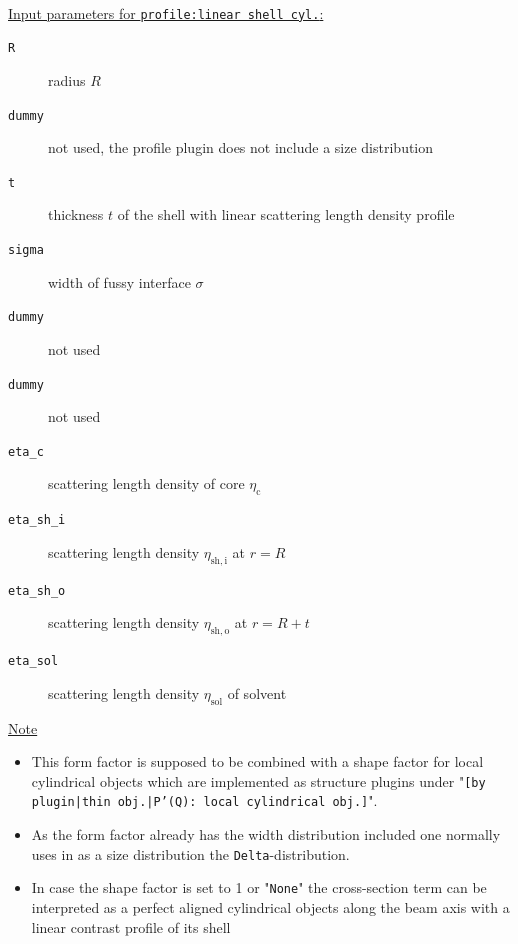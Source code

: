 \hspace{1pt}\\
\uline{Input parameters for \texttt{profile:linear shell cyl.}:}
\begin{description}
    \item[\texttt{R}] radius $R$
    \item[\texttt{dummy}] not used, the profile plugin does not include a size distribution
    \item[\texttt{t}] thickness $t$ of the shell with linear scattering length density profile
    \item[\texttt{sigma}] width of fussy interface $\sigma$
    \item[\texttt{dummy}] not used
    \item[\texttt{dummy}] not used
    \item[\texttt{eta\_c}] scattering length density of core $\eta_\mathrm{c}$
    \item[\texttt{eta\_sh\_i}] scattering length density $\eta_\mathrm{sh,i}$ at $r=R$
    \item[\texttt{eta\_sh\_o}] scattering length density $\eta_\mathrm{sh,o}$ at $r=R+t$
    \item[\texttt{eta\_sol}] scattering length density $\eta_\mathrm{sol}$ of solvent
\end{description}

\noindent
\uline{Note}
\begin{itemize}
  \item This form factor is supposed to be combined with a shape factor for
local cylindrical objects which are implemented as structure  plugins
under "\texttt{[by plugin|thin obj.|P'(Q): local cylindrical obj.]}".
\item As the form factor already has the width distribution included one normally uses in \SASfit as a size distribution
the \texttt{Delta}-distribution.
\item In case the shape factor is set to 1 or "\texttt{None}" the cross-section term can be interpreted as a perfect aligned cylindrical objects along the beam axis with a linear contrast profile of its shell
\end{itemize}
\clearpage

